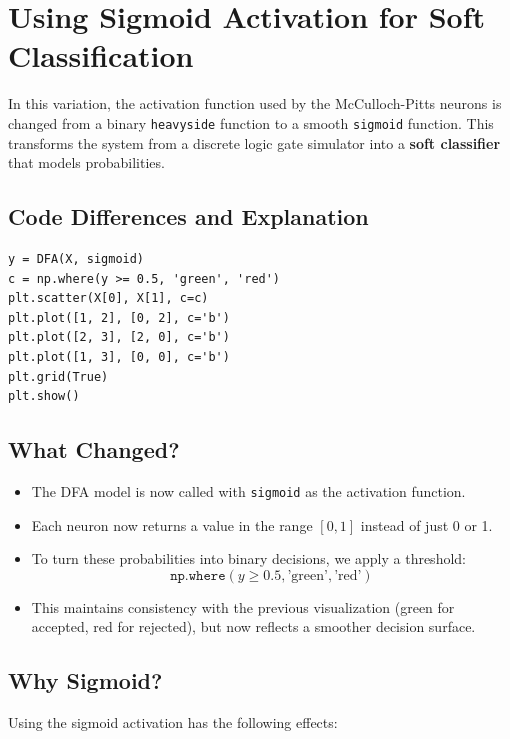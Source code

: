 \documentclass{article}
\begin{document}
\section{Using Sigmoid Activation for Soft Classification}

In this variation, the activation function used by the McCulloch-Pitts neurons is changed from a binary \texttt{heavyside} function to a smooth \texttt{sigmoid} function. This transforms the system from a discrete logic gate simulator into a \textbf{soft classifier} that models probabilities.

\subsection*{Code Differences and Explanation}

\begin{verbatim}
y = DFA(X, sigmoid)
c = np.where(y >= 0.5, 'green', 'red')
plt.scatter(X[0], X[1], c=c)
plt.plot([1, 2], [0, 2], c='b')
plt.plot([2, 3], [2, 0], c='b')
plt.plot([1, 3], [0, 0], c='b')
plt.grid(True)
plt.show()
\end{verbatim}

\subsection*{What Changed?}

\begin{itemize}
    \item The DFA model is now called with \texttt{sigmoid} as the activation function.
    \item Each neuron now returns a value in the range $[0, 1]$ instead of just 0 or 1.
    \item To turn these probabilities into binary decisions, we apply a threshold:
    \[
    \texttt{np.where}(y \geq 0.5, \text{'green'}, \text{'red'})
    \]
    \item This maintains consistency with the previous visualization (green for accepted, red for rejected), but now reflects a smoother decision surface.
\end{itemize}

\subsection*{Why Sigmoid?}

Using the sigmoid activation has the following effects:
\end{document}

